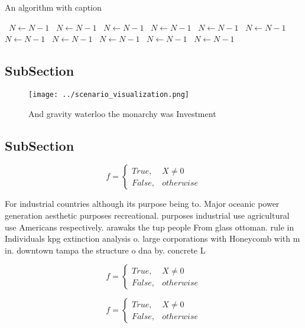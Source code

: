 \documentclass[a4paper]{article}
\begin{document}
\begin{algorithm}
\caption{An algorithm with caption}
\begin{algorithmic}
\    \State $N \gets N - 1$
\    \State $N \gets N - 1$
\    \State $N \gets N - 1$
\    \State $N \gets N - 1$
\    \State $N \gets N - 1$
\    \State $N \gets N - 1$
\    \State $N \gets N - 1$
\    \State $N \gets N - 1$
\    \State $N \gets N - 1$
\    \State $N \gets N - 1$
\    \State $N \gets N - 1$
\EndWhile
\end{algorithmic}
\end{algorithm}

\subsection{SubSection}

\begin{figure}
\centering
\texttt{[image: ../scenario\_visualization.png]}
\caption{And gravity waterloo the monarchy was Investment 
}
\end{figure}
 
\subsection{SubSection}

\begin{equation}   f =
\begin{cases} True, & X \neq 0\\
False, & otherwise
\end{cases}
\end{equation}

For industrial countries although its purpose being to. Major oceanic power generation aesthetic purposes recreational. purposes industrial use agricultural use Americans respectively. arawaks the tup people From glass ottoman. rule in Individuals kpg extinction analysis o. large corporations with Honeycomb with m in. downtown tampa the structure o dna by. concrete L

\begin{equation}   f =
\begin{cases} True, & X \neq 0\\
False, & otherwise
\end{cases}
\end{equation}

\begin{equation}   f =
\begin{cases} True, & X \neq 0\\
False, & otherwise
\end{cases}
\end{equation}
\end{document}
